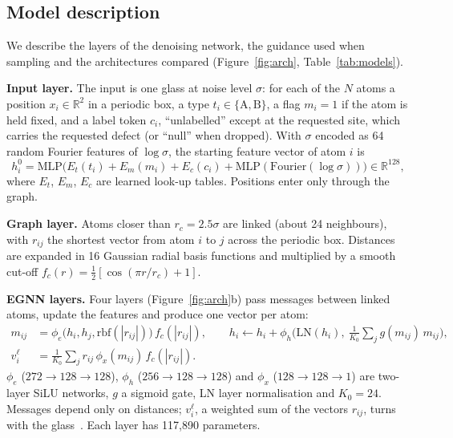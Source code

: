 \documentclass[10pt]{article}
\begin{document}
\subsection{Model description}
We describe the layers of the denoising network, the guidance used when sampling and the architectures compared (Figure~\ref{fig:arch}, Table~\ref{tab:models}).

\textbf{Input layer.} The input is one glass at noise level $\sigma$: for each of the $N$ atoms a position $x_i\in\mathbb R^2$ in a periodic box, a type $t_i\in\{\text{A},\text{B}\}$, a flag $m_i=1$ if the atom is held fixed, and a label token $c_i$, ``unlabelled'' except at the requested site, which carries the requested defect (or ``null'' when dropped). With $\sigma$ encoded as 64 random Fourier features of $\log\sigma$, the starting feature vector of atom $i$ is
\begin{equation}
h_i^0=\mathrm{MLP}\big(E_t(t_i)+E_m(m_i)+E_c(c_i)+\mathrm{MLP}(\mathrm{Fourier}(\log\sigma))\big)\in\mathbb R^{128},
\end{equation}
where $E_t$, $E_m$, $E_c$ are learned look-up tables. Positions enter only through the graph.

\textbf{Graph layer.} Atoms closer than $r_c=2.5\sigma$ are linked (about 24 neighbours), with $r_{ij}$ the shortest vector from atom $i$ to $j$ across the periodic box. Distances are expanded in 16 Gaussian radial basis functions and multiplied by a smooth cut-off $f_c(r)=\tfrac12[\cos(\pi r/r_c)+1]$.

\textbf{EGNN layers.} Four layers (Figure~\ref{fig:arch}b) pass messages between linked atoms, update the features and produce one vector per atom:
\begin{equation}
\begin{aligned}
m_{ij}&=\phi_e\big(h_i,h_j,\mathrm{rbf}(|r_{ij}|)\big)\,f_c(|r_{ij}|),\qquad
h_i\leftarrow h_i+\phi_h\Big(\mathrm{LN}(h_i),\ \tfrac{1}{K_0}\textstyle\sum_j g(m_{ij})\,m_{ij}\Big),\\
v_i^\ell&=\tfrac{1}{K_0}\textstyle\sum_j r_{ij}\,\phi_x(m_{ij})\,f_c(|r_{ij}|).
\end{aligned}
\end{equation}
$\phi_e$ ($272\to128\to128$), $\phi_h$ ($256\to128\to128$) and $\phi_x$ ($128\to128\to1$) are two-layer SiLU networks, $g$ a sigmoid gate, LN layer normalisation and $K_0=24$. Messages depend only on distances; $v_i^\ell$, a weighted sum of the vectors $r_{ij}$, turns with the glass~\citep{satorras2021egnn}. Each layer has 117,890 parameters.
\end{document}
